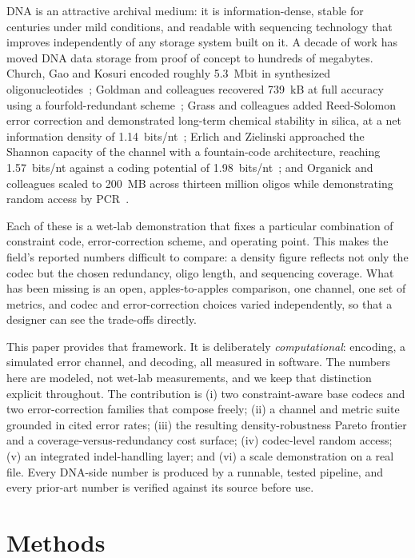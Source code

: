\documentclass[11pt]{article}
\begin{document}
DNA is an attractive archival medium: it is information-dense, stable for centuries under
mild conditions, and readable with sequencing technology that improves independently of
any storage system built on it. A decade of work has moved DNA data storage from
proof of concept to hundreds of megabytes. Church, Gao and Kosuri encoded roughly
\num{5.3}~Mbit in synthesized oligonucleotides~\cite{church2012}; Goldman and colleagues
recovered \num{739}~kB at full accuracy using a fourfold-redundant scheme~\cite{goldman2013};
Grass and colleagues added Reed-Solomon error correction and demonstrated
long-term chemical stability in silica, at a net information density of
\num{1.14}~bits/nt~\cite{grass2015}; Erlich and Zielinski approached the Shannon capacity
of the channel with a fountain-code architecture, reaching \num{1.57}~bits/nt against a
coding potential of \num{1.98}~bits/nt~\cite{erlich2017}; and Organick and colleagues
scaled to \num{200}~MB across thirteen million oligos while demonstrating random access
by PCR~\cite{organick2018}.

Each of these is a wet-lab demonstration that fixes a particular combination of
constraint code, error-correction scheme, and operating point. This makes the field's
reported numbers difficult to compare: a density figure reflects not only the codec but
the chosen redundancy, oligo length, and sequencing coverage. What has been missing is an
open, apples-to-apples comparison, one channel, one set of metrics, and codec and
error-correction choices varied independently, so that a designer can see the trade-offs
directly.

This paper provides that framework. It is deliberately \emph{computational}: encoding, a
simulated error channel, and decoding, all measured in software. The numbers here are
modeled, not wet-lab measurements, and we keep that distinction explicit throughout. The
contribution is (i) two constraint-aware base codecs and two error-correction families
that compose freely; (ii) a channel and metric suite grounded in cited error rates;
(iii) the resulting density-robustness Pareto frontier and a coverage-versus-redundancy
cost surface; (iv) codec-level random access; (v) an integrated indel-handling layer; and
(vi) a scale demonstration on a real file. Every DNA-side number is produced by a runnable,
tested pipeline, and every prior-art number is verified against its source before use.

\section{Methods}
\end{document}
